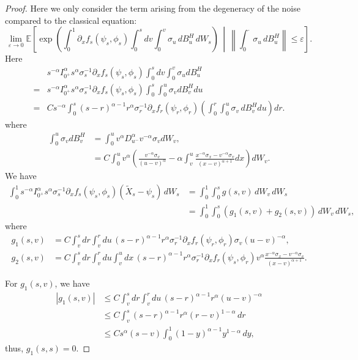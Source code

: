 \documentclass{article}
\theoremstyle{definition}  %
\theoremstyle{plain}  %
\begin{document}
\begin{proof}
Here we only consider the term arising from the degeneracy of the noise compared to the classical equation:  
\begin{equation*}
    \lim_{\varepsilon\to 0}\mathbb{E} \left[ \exp \left( \int_0^1 \partial_x f_s(\psi_s,\phi_s)\int_0^s dv \int_0^v \sigma_u \,dB^H_u  \, dW_s \right) \,\middle|\, \left\| \int_0^\cdot \sigma_u \, dB^H_u \right\| \leq \varepsilon  \right].
\end{equation*}
Here
\begin{align*}
    &s^{-\alpha}I_{0^+}^\alpha s^{\alpha} \sigma_s^{-1}\partial_x f_s(\psi_s,\phi_s)\int_0^s dv \int_0^v \sigma_u dB^H_u  \\
    =& s^{-\alpha}I^\alpha_{0^+}s^{\alpha} \sigma_s^{-1}\partial_x f_s(\psi_s,\phi_s)\int_0^s \int_0^u \sigma_v dB^H_v du \\
    =& C s^{-\alpha}\int_0^s (s-r)^{\alpha-1} r^{\alpha} \sigma_r^{-1}\partial_x f_r(\psi_r,\phi_r)\left( \int_0^r   \int_0^u \sigma_v \, dB^H_v   du   \right)dr.
\end{align*}
where
\begin{align*}
    \int_0^u \sigma_v dB^H_v &= \int_0^u v^{\alpha} D_{u^-}^\alpha  v^{-\alpha}\sigma_v dW_v, \\
    &= C\int_0^u v^\alpha\left(  \frac{v^{-\alpha}\sigma_v}{(u-v)^\alpha} 
	- \alpha \int_v^u \frac{x^{-\alpha}\sigma_x - v^{-\alpha}\sigma_v}{(x-v)^{\alpha+1}} dx \right) dW_v.
\end{align*}
   We have
\begin{align*}
    \int_0^1  s^{-\alpha}I_{0^+}^\alpha s^{\alpha} \sigma_s^{-1}\partial_x f_s(\psi_s,\phi_s)(\tilde{X}_s-\psi_s) \, dW_s
    &= \int_0^1 \int_0^s g(s,v) \, dW_v \, dW_s \\
    &= \int_0^1 \int_0^s \left( g_1(s,v) + g_2(s,v) \right) \, dW_v \, dW_s,
\end{align*}
where
\begin{align*}
    g_1(s,v) &= C \int_v^s dr \int_v^r du \, (s-r)^{\alpha-1} r^\alpha \sigma_r^{-1} \partial_x f_r(\psi_r,\phi_r) \sigma_v (u-v)^{-\alpha}, \\
    g_2(s,v) &= C \int_v^s dr \int_v^r du \int_v^u dx \, (s-r)^{\alpha-1} r^\alpha \sigma_r^{-1} \partial_x f_r(\psi_s,\phi_r) v^\alpha \frac{x^{-\alpha}\sigma_x - v^{-\alpha}\sigma_v}{(x-v)^{\alpha+1}}.
\end{align*}

For \(g_1(s,v)\), we have
\begin{align*}
    |g_1(s,v)| &\leq C \int_v^s dr \int_v^r du \, (s-r)^{\alpha-1} r^\alpha (u-v)^{-\alpha} \\
    &\leq C \int_v^s (s-r)^{\alpha-1} r^\alpha (r-v)^{1-\alpha} \, dr \\
    &\leq C s^\alpha (s-v) \int_0^1 (1-y)^{\alpha-1} y^{1-\alpha} \, dy,
\end{align*}
thus, \(g_1(s,s) = 0\).


\end{proof}
\end{document}
